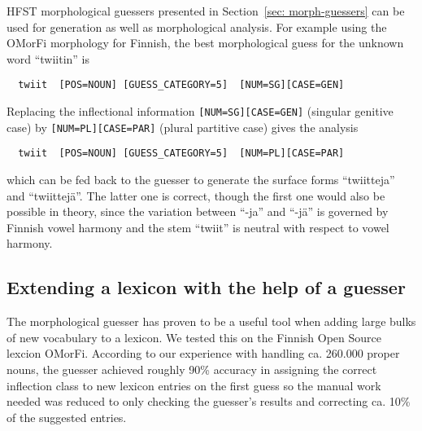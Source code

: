 \documentclass{llncs}
\begin{document}
HFST morphological guessers presented in Section~\ref{sec:
  morph-guessers} can be used for generation as well as morphological
analysis. For example using the OMorFi morphology for Finnish, the
best morphological guess for the unknown word ``twiitin'' is
\begin{verbatim}
  twiit  [POS=NOUN] [GUESS_CATEGORY=5]  [NUM=SG][CASE=GEN]
\end{verbatim}
Replacing the inflectional information {\tt [NUM=SG][CASE=GEN]}
(singular genitive case) by {\tt [NUM=PL][CASE=PAR]} (plural
partitive case) gives the analysis
\begin{verbatim}
  twiit  [POS=NOUN] [GUESS_CATEGORY=5]  [NUM=PL][CASE=PAR]
\end{verbatim}
which can be fed back to the guesser to generate the surface forms
``twiitteja'' and ``twiittejä''. The latter one is correct, though the
first one would also be possible in theory, since the variation
between ``-ja'' and ``-jä'' is governed by Finnish vowel harmony and
the stem ``twiit'' is neutral with respect to vowel harmony.


\subsection{Extending a lexicon with the help of a guesser}

The morphological guesser has proven to be a useful tool when adding 
large bulks of new vocabulary to a lexicon. We tested this on the Finnish Open Source
lexcion OMorFi. According to our experience with handling ca. 260.000 proper nouns, the guesser achieved
roughly 90\% accuracy in assigning the correct inflection class to new
lexicon entries on the first guess so the manual work needed was reduced to only
checking the guesser's results and correcting ca. 10\% of the suggested
entries. 
\end{document}
